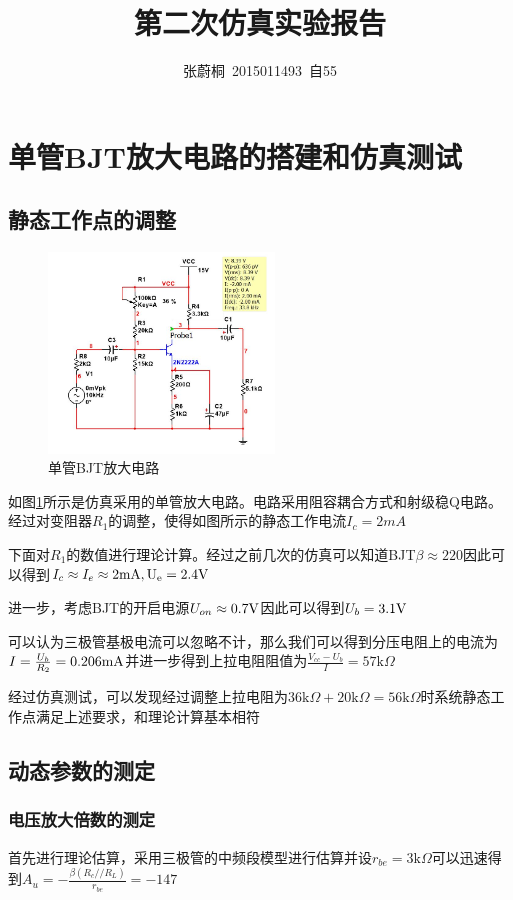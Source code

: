 \documentclass[UTF8,a4paper]{ctexart}
\title{第二次仿真实验报告}
\author{张蔚桐\ 2015011493\ 自55}
\begin{document}
\newcommand{\tabincell}[2]{\begin{tabular}{@{}#1@{}}#2\end{tabular}}
\maketitle
\tableofcontents
\clearpage
\section{单管BJT放大电路的搭建和仿真测试}
\subsection{静态工作点的调整}
\begin{figure}
\includegraphics[width=60mm]{1-1.jpg}
\caption{单管BJT放大电路}
\label{bjtc}
\end{figure}
如图\ref{bjtc}所示是仿真采用的单管放大电路。电路采用阻容耦合方式和射级稳Q电路。经过对变阻器$R_1$的调整，使得如图所示的静态工作电流$I_c=2mA$

下面对$R_1$的数值进行理论计算。经过之前几次的仿真可以知道BJT$\beta\approx220$因此可以得到$I_c\approx I_e\approx 2\rm{mA},U_e=2.4\rm{V}$

进一步，考虑BJT的开启电源$U_{on}\approx0.7\rm{V}$因此可以得到$U_b=3.1\rm{V}$

可以认为三极管基极电流可以忽略不计，那么我们可以得到分压电阻上的电流为
$I=\frac{U_b}{R_2}=0.206\rm{mA}$并进一步得到上拉电阻阻值为$\frac{V_{cc}-U_{b}}{I}=57\mathrm{k}\Omega$

经过仿真测试，可以发现经过调整上拉电阻为$36\mathrm{k}\Omega+20\mathrm{k}\Omega=56\mathrm{k}\Omega$时系统静态工作点满足上述要求，和理论计算基本相符
\subsection{动态参数的测定}
\subsubsection{电压放大倍数的测定}
首先进行理论估算，采用三极管的中频段模型进行估算并设$r_{be}=3\mathrm{k}\Omega$可以迅速得到$A_u=-\frac{\beta(R_c//R_L)}{r_{be}}=-147$
\end{document}
